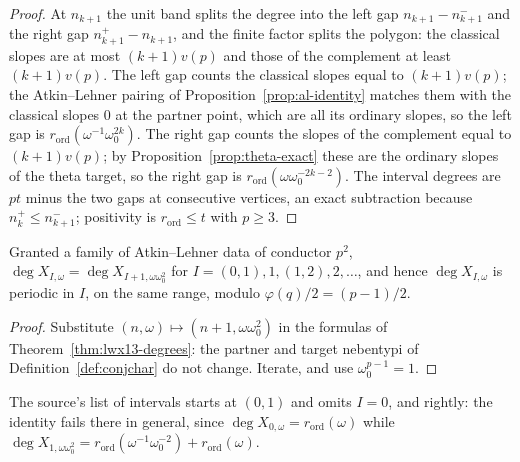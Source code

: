 \begin{proof}
  \leanok
  At $n_{k+1}$ the unit band splits the degree into the left gap $n_{k+1} - n_{k+1}^{-}$ and the
  right gap $n_{k+1}^{+} - n_{k+1}$, and the finite factor splits the polygon: the classical
  slopes are at most $(k+1)v(p)$ and those of the complement at least $(k+1)v(p)$.  The left gap
  counts the classical slopes equal to $(k+1)v(p)$; the Atkin--Lehner pairing of
  Proposition~\ref{prop:al-identity} matches them with the classical slopes $0$ at the partner
  point, which are all its ordinary slopes, so the left gap is
  $r_{\mathrm{ord}}(\omega^{-1}\omega_0^{2k})$.  The right gap counts the slopes of the complement
  equal to $(k+1)v(p)$; by Proposition~\ref{prop:theta-exact} these are the ordinary slopes of the
  theta target, so the right gap is $r_{\mathrm{ord}}(\omega\omega_0^{-2k-2})$.  The interval
  degrees are $pt$ minus the two gaps at consecutive vertices, an exact subtraction because
  $n_k^{+} \leq n_{k+1}^{-}$; positivity is $r_{\mathrm{ord}} \leq t$ with $p \geq 3$.
\end{proof}

\begin{corollary}
  \label{cor:lwx14}
  \leanok
  Granted a family of Atkin--Lehner data of conductor $p^{2}$,
  $\deg X_{I,\omega} = \deg X_{I+1,\omega\omega_0^{2}}$ for $I = (0,1), 1, (1,2), 2, \dots$, and
  hence $\deg X_{I,\omega}$ is periodic in $I$, on the same range, modulo
  $\varphi(q)/2 = (p-1)/2$.
\end{corollary}

\begin{proof}
  \leanok
  Substitute $(n,\omega) \mapsto (n+1,\omega\omega_0^{2})$ in the formulas of
  Theorem~\ref{thm:lwx13-degrees}: the partner and target nebentypi of
  Definition~\ref{def:conjchar} do not change.  Iterate, and use $\omega_0^{p-1} = 1$.
\end{proof}

The source's list of intervals starts at $(0,1)$ and omits $I = 0$, and rightly: the identity
fails there in general, since $\deg X_{0,\omega} = r_{\mathrm{ord}}(\omega)$ while
$\deg X_{1,\omega\omega_0^{2}} = r_{\mathrm{ord}}(\omega^{-1}\omega_0^{-2}) +
r_{\mathrm{ord}}(\omega)$.

